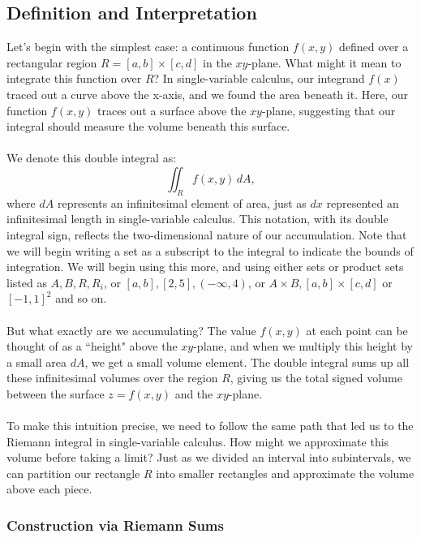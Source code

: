 \subsection*{Definition and Interpretation} 

\noindent Let's begin with the simplest case: a continuous function \(f(x,y)\) defined over a rectangular region \(R = [a,b] \times [c,d]\) in the \(xy\)-plane. What might it mean to integrate this function over $R$? In single-variable calculus, our integrand \(f(x)\) traced out a curve above the x-axis, and we found the area beneath it. Here, our function \(f(x,y)\) traces out a surface above the $xy$-plane, suggesting that our integral should measure the volume beneath this surface. \\ \\
We denote this double integral as:
\[
\iint_R f(x,y) \, dA,
\]
where \(dA\) represents an infinitesimal element of area, just as \(dx\) represented an infinitesimal length in single-variable calculus. This notation, with its double integral sign, reflects the two-dimensional nature of our accumulation. Note that we will begin writing a set as a subscript to the integral to indicate the bounds of integration. We will begin using this more, and using either sets or product sets listed as $A,B,R,R_i$, or $[a,b],[2,5],(-\infty,4)$, or $A \times B, [a,b] \times [c,d]$ or $[-1,1]^2$ and so on. \\ \\
But what exactly are we accumulating? The value \(f(x,y)\) at each point can be thought of as a ``height" above the $xy$-plane, and when we multiply this height by a small area \(dA\), we get a small volume element. The double integral sums up all these infinitesimal volumes over the region $R$, giving us the total signed volume between the surface \(z = f(x,y)\) and the $xy$-plane. \\ \\
To make this intuition precise, we need to follow the same path that led us to the Riemann integral in single-variable calculus. How might we approximate this volume before taking a limit? Just as we divided an interval into subintervals, we can partition our rectangle $R$ into smaller rectangles and approximate the volume above each piece.

\subsubsection*{Construction via Riemann Sums} 

